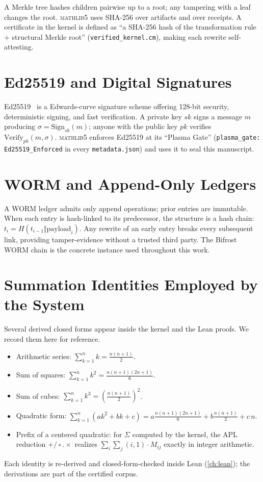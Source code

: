 A Merkle tree hashes children pairwise up to a root; any tampering with a leaf
changes the root. \textsc{mathlib5} uses SHA-256 over artifacts and over
receipts. A certificate in the kernel is defined as ``a SHA-256 hash of the
transformation rule + structural Merkle root'' (\texttt{verified\_kernel.cm}),
making each rewrite self-attesting.

\section{Ed25519 and Digital Signatures}
\label{sec:pre-ed25519}

Ed25519~\cite{ed25519} is a Edwards-curve signature scheme offering 128-bit
security, deterministic signing, and fast verification. A private key $sk$
signs a message $m$ producing $\sigma = \text{Sign}_{sk}(m)$; anyone with the
public key $pk$ verifies $\text{Verify}_{pk}(m,\sigma)$. \textsc{mathlib5}
enforces Ed25519 at its ``Plasma Gate'' (\texttt{plasma\_gate:
Ed25519\_Enforced} in every \texttt{metadata.json}) and uses it to seal this
manuscript.

\section{WORM and Append-Only Ledgers}
\label{sec:pre-worm}

A WORM ledger admits only append operations; prior entries are immutable. When
each entry is hash-linked to its predecessor, the structure is a hash chain:
$t_i = H(t_{i-1} \Vert \text{payload}_i)$. Any rewrite of an early entry
breaks every subsequent link, providing tamper-evidence without a trusted
third party. The Bifrost WORM chain is the concrete instance used throughout
this work.

\section{Summation Identities Employed by the System}
\label{sec:prelim-sums}

Several derived closed forms appear inside the kernel and the Lean proofs.
We record them here for reference.

\begin{itemize}
  \item Arithmetic series: $\sum_{k=1}^{n} k = \frac{n(n+1)}{2}$.
  \item Sum of squares: $\sum_{k=1}^{n} k^2 = \frac{n(n+1)(2n+1)}{6}$.
  \item Sum of cubes: $\sum_{k=1}^{n} k^3 = \left(\frac{n(n+1)}{2}\right)^2$.
  \item Quadratic form: $\sum_{k=1}^{n} (a k^2 + b k + c)
        = a\frac{n(n+1)(2n+1)}{6} + b\frac{n(n+1)}{2} + c\,n$.
  \item Prefix of a centered quadratic: for $\Sigma$ computed by the kernel,
        the APL reduction $\texttt{+/} \circ.\times$ realizes
        $\sum_i \sum_j (i,1)\cdot M_{ij}$ exactly in integer arithmetic.
\end{itemize}
Each identity is re-derived and closed-form-checked inside Lean
(\cref{ch:lean}); the derivations are part of the certified corpus.

